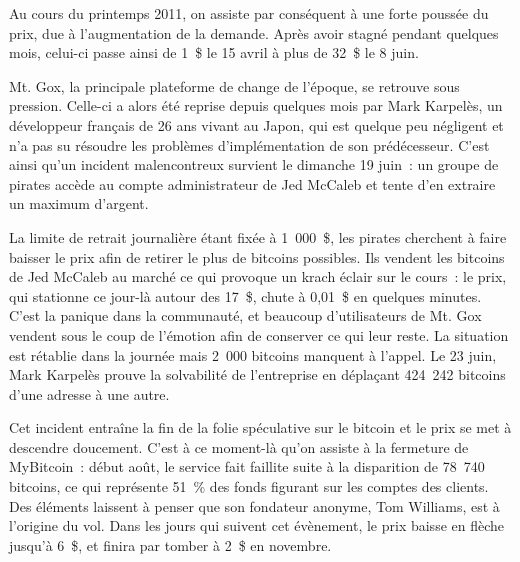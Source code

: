 
Au cours du printemps 2011, on assiste par conséquent à une forte poussée du prix, due à l'augmentation de la demande. Après avoir stagné pendant quelques mois, celui-ci passe ainsi de 1~\$ le 15 avril à plus de 32~\$ le 8 juin.


Mt. Gox, la principale plateforme de change de l'époque, se retrouve sous pression. Celle-ci a alors été reprise depuis quelques mois par Mark Karpelès, un développeur français de 26 ans vivant au Japon, qui est quelque peu négligent et n'a pas su résoudre les problèmes d'implémentation de son prédécesseur. C'est ainsi qu'un incident malencontreux survient le dimanche 19 juin~: un groupe de pirates accède au compte administrateur de Jed McCaleb et tente d'en extraire un maximum d'argent.

La limite de retrait journalière étant fixée à 1~000~\$, les pirates cherchent à faire baisser le prix afin de retirer le plus de bitcoins possibles. Ils vendent les bitcoins de Jed McCaleb au marché ce qui provoque un krach éclair sur le cours~: le prix, qui stationne ce jour-là autour des 17~\$, chute à 0,01~\$ en quelques minutes. C'est la panique dans la communauté, et beaucoup d'utilisateurs de Mt. Gox vendent sous le coup de l'émotion afin de conserver ce qui leur reste. La situation est rétablie dans la journée mais 2~000 bitcoins manquent à l'appel. Le 23 juin, Mark Karpelès prouve la solvabilité de l'entreprise en déplaçant 424~242 bitcoins d'une adresse à une autre.

Cet incident entraîne la fin de la folie spéculative sur le bitcoin et le prix se met à descendre doucement. C'est à ce moment-là qu'on assiste à la fermeture de MyBitcoin~: début août, le service fait faillite suite à la disparition de 78~740 bitcoins, ce qui représente 51~\% des fonds figurant sur les comptes des clients. Des éléments laissent à penser que son fondateur anonyme, Tom Williams, est à l'origine du vol. Dans les jours qui suivent cet évènement, le prix baisse en flèche jusqu'à 6~\$, et finira par tomber à 2~\$ en novembre.

